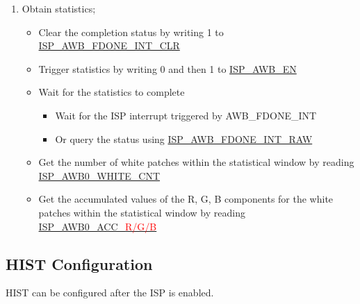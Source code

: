 \documentclass[main\_\_EN.tex]{subfiles}
\begin{document}
\begin{enumerate}
    \item Obtain statistics;
    \begin{itemize}
        \item Clear the completion status by writing 1 to \hyperref[fielddesc:ISPAWBFDONEINTCLR]{ISP\_AWB\_FDONE\_INT\_CLR}
        \item Trigger statistics by writing 0 and then 1 to \hyperref[fielddesc:ISPAWBEN]{ISP\_AWB\_EN}
        \item Wait for the statistics to complete
        \begin{itemize}
            \item Wait for the ISP interrupt triggered by AWB\_FDONE\_INT
            \item Or query the status using \hyperref[fielddesc:ISPAWBFDONEINTRAW]{ISP\_AWB\_FDONE\_INT\_RAW}
        \end{itemize}
        \item Get the number of white patches within the statistical window by reading \hyperref[fielddesc:ISPAWB0WHITECNT]{ISP\_AWB0\_WHITE\_CNT}
        \item Get the accumulated values of the R, G, B components for the white patches within the statistical window by reading \hyperref[fielddesc:ISPAWB0ACCR]{ISP\_AWB0\_ACC\_\textcolor{red}{R/G/B}}
    \end{itemize}
\end{enumerate}


\subsection{HIST Configuration}
HIST can be configured after the ISP is enabled.
\end{document}
